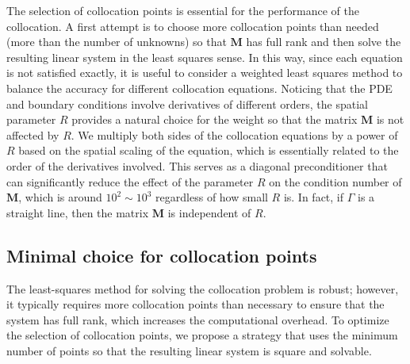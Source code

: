 \documentclass[preprint,11pt]{elsarticle}
\theoremstyle{remark}
\newcommand{\bm}[1]{\boldsymbol{#1}}
\begin{document}
The selection of collocation points is essential for the performance of the collocation. 
A first attempt is to choose more collocation points than needed (more than the number of unknowns) so that $\bm M$ has full rank and then solve the resulting linear system in the least squares sense. In this way, since each equation is not satisfied exactly, it is useful to consider a weighted least squares method to balance the accuracy for different collocation equations. 
Noticing that the PDE and boundary conditions involve derivatives of different orders, the spatial parameter $R$ provides a natural choice for the weight so that the matrix $\bm M$ is not affected by $R$. 
We multiply both sides of the collocation equations by a power of $R$ based on the spatial scaling of the equation, which is essentially related to the order of the derivatives involved. This serves as a diagonal preconditioner that can significantly reduce the effect of the parameter $R$ on the condition number of $\bm M$, which is around $10^2\sim 10^3$ regardless of how small $R$ is.
In fact, if $\Gamma$ is a straight line, then the matrix $\bm M$ is independent of $R$.


\subsection{Minimal choice for collocation points}
The least-squares method for solving the collocation problem is robust; however, it typically requires more collocation points than necessary to ensure that the system has full rank, which increases the computational overhead. To optimize the selection of collocation points, we propose a strategy that uses the minimum number of points so that the resulting linear system is square and solvable.
\end{document}
